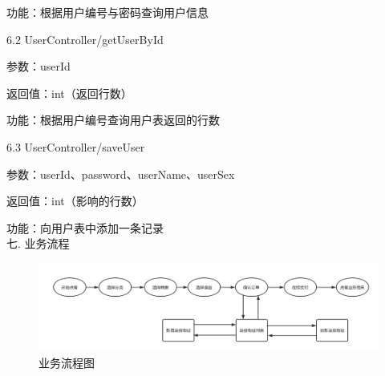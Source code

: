 功能：根据用户编号与密码查询用户信息

6.2 UserController/getUserById 

参数：userId 

返回值：int（返回行数）

功能：根据用户编号查询用户表返回的行数

6.3 UserController/saveUser 

参数：userId、password、userName、userSex

返回值：int（影响的行数）

功能：向用户表中添加一条记录~\\

\noindent
七. 业务流程

\begin{figure}[H]
    \centering
    \includegraphics[scale=0.45]{figures/flowchart.png}
    \caption{业务流程图}
\end{figure}

